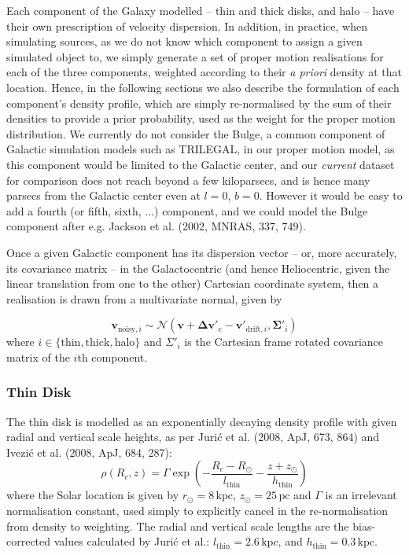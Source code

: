 \documentclass[fleqn,usenatbib]{mnras}
\begin{document}
Each component of the Galaxy modelled -- thin and thick disks, and halo -- have their own prescription of velocity dispersion. In addition, in practice, when simulating sources, as we do not know which component to assign a given simulated object to, we simply generate a set of proper motion realisations for each of the three components, weighted according to their \textit{a priori} density at that location. Hence, in the following sections we also describe the formulation of each component's density profile, which are simply re-normalised by the sum of their densities to provide a prior probability, used as the weight for the proper motion distribution. We currently do not consider the Bulge, a common component of Galactic simulation models such as TRILEGAL, in our proper motion model, as this component would be limited to the Galactic center, and our \textit{current} dataset for comparison does not reach beyond a few kiloparsecs, and is hence many parsecs from the Galactic center even at $l = 0$, $b = 0$. However it would be easy to add a fourth (or fifth, sixth, ...) component, and we could model the Bulge component after e.g. Jackson et al. (2002, MNRAS, 337, 749).

Once a given Galactic component has its dispersion vector -- or, more accurately, its covariance matrix -- in the Galactocentric (and hence Heliocentric, given the linear translation from one to the other) Cartesian coordinate system, then a realisation is drawn from a multivariate normal, given by

\begin{equation}
    \bm{v}_{\mathrm{noisy}, i} \sim \mathcal{N}(\bm{v} + \bm{\Delta v}{'}_\mathrm{\!\!c} - \bm{v}{'}_{\mathrm{\!\!drift}, i}, \bm{\Sigma}{'}_{\!i})
\end{equation}
where $i \in \{\mathrm{thin}, \mathrm{thick}, \mathrm{halo}\}$ and $\Sigma{'}_{\!i}$ is the Cartesian frame rotated covariance matrix of the $i$th component.

\subsubsection{Thin Disk}
The thin disk is modelled as an exponentially decaying density profile with given radial and vertical scale heights, as per Juri\'{c} et al. (2008, ApJ, 673, 864) and Ivezi\'{c} et al. (2008, ApJ, 684, 287):
\begin{equation}
    \rho(R_c, z) = \Gamma \exp\left(-\frac{R_c - R_\odot}{l_\mathrm{thin}} - \frac{z + z_\odot}{h_\mathrm{thin}}\right)
\end{equation}
where the Solar location is given by $r_\odot = 8\,\mathrm{kpc}$, $z_\odot = 25\,\mathrm{pc}$ and $\Gamma$ is an irrelevant normalisation constant, used simply to explicitly cancel in the re-normalisation from density to weighting. The radial and vertical scale lengths are the bias-corrected values calculated by Juri\'{c} et al.: $l_\mathrm{thin} = 2.6\,\mathrm{kpc}$, and $h_\mathrm{thin} = 0.3\,\mathrm{kpc}$.
\end{document}
